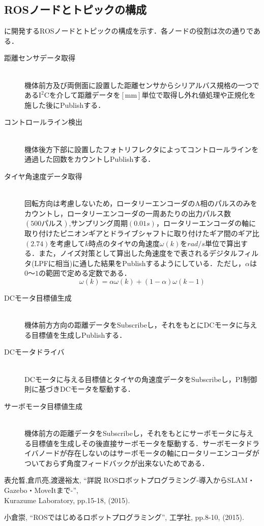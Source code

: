 \documentclass[11pt,a4j]{jarticle}
\begin{document}
\newpage
\subsection{ROSノードとトピックの構成}
に開発するROSノードとトピックの構成を示す．各ノードの役割は次の通りである．
\begin{description}

    \item[距離センサデータ取得] \mbox{} \\
      機体前方及び両側面に設置した距離センサからシリアルバス規格の一つである$\mathrm{I^2C}$を介して距離データを$\mathrm{[mm]}$単位で取得し外れ値処理や正規化を施した後にPublishする．
    \item[コントロールライン検出] \mbox{} \\
      機体後方下部に設置したフォトリフレクタによってコントロールラインを通過した回数をカウントしPublishする．

    \item[タイヤ角速度データ取得] \mbox{} \\
      回転方向は考慮しないため，ロータリーエンコーダのA相のパルスのみをカウントし，ロータリーエンコーダの一周あたりの出力パルス数$(500パルス)$,サンプリング周期$(0.01\unit{s})$，ロータリーエンコーダの軸に取り付けたピニオンギアとドライブシャフトに取り付けたギア間のギア比$(2.74)$を考慮して$k$時点のタイヤの角速度$\omega(k)$を$\unit{rad/s}$単位で算出する．また，ノイズ対策として算出した角速度をで表されるデジタルフィルタ(LPFに相当)に通した結果をPublishするようにしている．ただし，$\alpha$は$0〜1$の範囲で定める定数である．\\
      \begin{equation}
      	\omega(k)=\alpha\omega(k)+(1-\alpha)\omega(k-1)\label{eq::lpf}
      \end{equation}

    \item[DCモータ目標値生成] \mbox{} \\
      機体前方方向の距離データをSubscribeし，それをもとにDCモータに与える目標値を生成しPublishする．

    \item[DCモータドライバ] \mbox{} \\
      DCモータに与える目標値とタイヤの角速度データをSubscribeし，PI制御則に基づきDCモータを駆動する．

    \item[サーボモータ目標値生成] \mbox{} \\
      機体前方の距離データをSubscribeし，それをもとにサーボモータに与える目標値を生成しその後直接サーボモータを駆動する．サーボモータドライバノードが存在しないのはサーボモータの軸にロータリーエンコーダがついておらず角度フィードバックが出来ないためである．

  \end{description}

\begin{thebibliography}{9}
    表允晳,倉爪亮,渡邊裕太, ``詳説 ROSロボットプログラミング-導入からSLAM・Gazebo・MoveItまで-'', \\
    Kurazume Laboratory, pp.15-18, (2015).

    小倉崇, ``ROSではじめるロボットプログラミング'', 工学社, pp.8-10, (2015).
    
\end{thebibliography}
\end{document}

